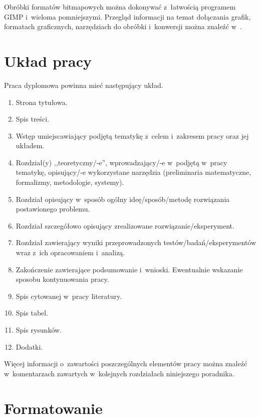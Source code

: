 \begin{enumerate}
  Obróbki formatów bitmapowych można dokonywać z~łatwością programem GIMP \cite{gimp,gimp_wiki} i~wieloma pomniejszymi. Przegląd informacji na temat dołączania grafik, formatach graficznych, narzędziach do obróbki i~konwersji można znaleźć w~\cite{grafika_wiki}.

\end{enumerate}

\section{Układ pracy}

Praca dyplomowa powinna mieć następujący układ.
\begin{enumerate}
\addtolength{\itemsep}{-2mm}
\item Strona tytułowa.
\item Spis treści.
\item Wstęp umiejscawiający podjętą tematykę z~celem i~zakresem pracy oraz jej układem.
\item Rozdział(y) ,,teoretyczny/-e'', wprowadzający/-e w~podjętą w~pracy tematykę, opisujący/-e wykorzystane narzędzia (preliminaria matematyczne, formalizmy, metodologie, systemy).
\item Rozdział opisujący w~sposób ogólny ideę/sposób/metodę rozwiązania postawionego problemu.
\item Rozdział szczegółowo opisujący zrealizowane rozwiązanie/eksperyment.
\item Rozdział zawierający wyniki przeprowadzonych testów/badań/eksperymentów wraz z~ich opracowaniem i~analizą.
\item Zakończenie zawierające podsumowanie i~wnioski. Ewentualnie wskazanie sposobu kontynuowania pracy.
\item Spis cytowanej w~pracy literatury.
\item Spis tabel.
\item Spis rysunków.
\item Dodatki.
\end{enumerate}
Więcej informacji o~zawartości poszczególnych elementów pracy można znaleźć w~komentarzach zawartych w~kolejnych rozdziałach niniejszego poradnika.


\section{Formatowanie}

